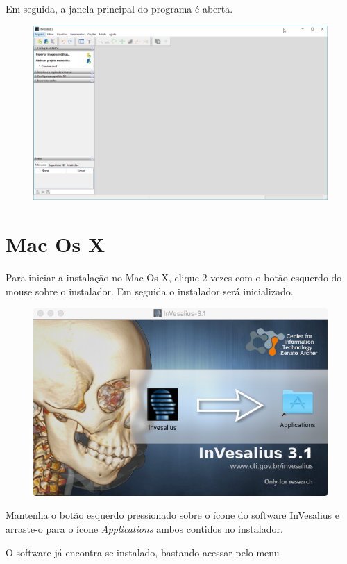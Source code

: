 \hspace{.2cm}

Em seguida, a janela principal do programa é aberta.

\begin{figure}[!htb]
\centering
\includegraphics[scale=0.4]{../user_guide_figures/invesalius_screen/main_window_without_project_pt.png}
\end{figure}

\section{Mac Os X}

Para iniciar a instalação no Mac Os X, clique 2 vezes com o botão esquerdo do mouse sobre o instalador.
Em seguida o instalador será inicializado.

\begin{figure}[!htb]
\centering
\includegraphics[scale=0.4]{../user_guide_figures/invesalius_screen/mac2.png}
\end{figure}

Mantenha o botão esquerdo pressionado sobre o ícone do software InVesalius e arraste-o para o ícone \textit{Applications}
ambos contidos no instalador.


O software já encontra-se instalado, bastando acessar pelo menu
